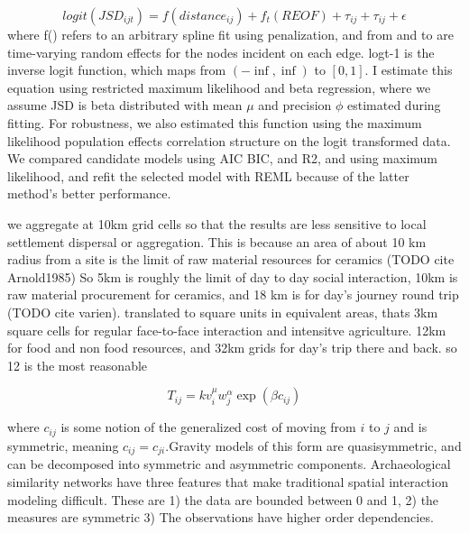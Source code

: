 \documentclass[11pt]{wlscirep}
\begin{document}
\begin{equation}
    logit\left(JSD_{ijt}\right) = f(distance_{ij}) + f_t(REOF) + \tau_{ij} + \tau_{ij} + \epsilon
\end{equation}
where f() refers to an arbitrary spline fit using penalization, and from and to are time-varying random effects for the nodes incident on each edge. logt-1 is the inverse logit function, which maps from $(-\inf, \inf)$ to $[0, 1]$. I estimate this equation using restricted maximum likelihood and beta regression, where we assume JSD is beta distributed with mean $\mu$ and precision $\phi$ estimated during fitting. For robustness, we also estimated this function using the maximum likelihood population effects correlation structure on the logit transformed data. We compared candidate models using AIC BIC, and R2, and using maximum likelihood, and refit the selected model with REML because of the latter method's better performance.




 
 we aggregate at 10km grid cells so that the results are less sensitive to local settlement dispersal or aggregation.
 This is because an area of about 10 km radius from a site is the limit of raw material resources for ceramics (TODO cite Arnold1985)
 So 5km is roughly the limit of day to day social interaction, 10km is raw material procurement for ceramics, and 18 km is for day's journey round trip (TODO cite varien). translated to square units in equivalent areas, thats 3km square cells for regular face-to-face interaction and intensitve agriculture. 12km for food and non food resources, and 32km grids for day's trip there and back. so 12 is the most reasonable
 


\begin{equation}
T_{ij} = k v_i^\mu w_j^\alpha \exp(\beta c_{ij})
\end{equation}

where $c_{ij}$ is some notion of the generalized cost of moving from $i$ to $j$ and is symmetric, meaning $c_{ij} = c_{ji}$.Gravity models of this form are quasisymmetric, and can be decomposed into symmetric and asymmetric components. 
Archaeological similarity networks have three features that make traditional spatial interaction modeling difficult. These are 1) the data are bounded between 0 and 1, 2) the measures are symmetric
3) The observations have higher order dependencies.
\end{document}
